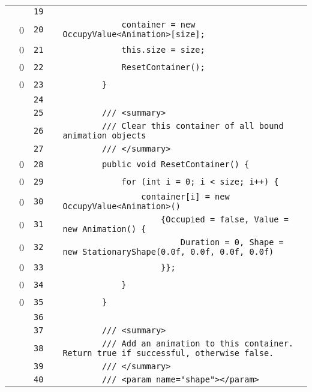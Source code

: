 \documentclass[a4paper,landscape,10pt]{article}
\begin{document}
\begin{longtable}[l]{lrrll}
\cellcolor{gray} &  & \verb~19~ & & \verb~~\\
\cellcolor{red} & 0 & \verb~20~ & & \verb~            container = new OccupyValue<Animation>[size];~\\
\cellcolor{red} & 0 & \verb~21~ & & \verb~            this.size = size;~\\
\cellcolor{red} & 0 & \verb~22~ & & \verb~            ResetContainer();~\\
\cellcolor{red} & 0 & \verb~23~ & & \verb~        }~\\
\cellcolor{gray} &  & \verb~24~ & & \verb~~\\
\cellcolor{gray} &  & \verb~25~ & & \verb~        /// <summary>~\\
\cellcolor{gray} &  & \verb~26~ & & \verb~        /// Clear this container of all bound animation objects~\\
\cellcolor{gray} &  & \verb~27~ & & \verb~        /// </summary>~\\
\cellcolor{red} & 0 & \verb~28~ & & \verb~        public void ResetContainer() {~\\
\cellcolor{red} & 0 & \verb~29~ & & \verb~            for (int i = 0; i < size; i++) {~\\
\cellcolor{red} & 0 & \verb~30~ & & \verb~                container[i] = new OccupyValue<Animation>()~\\
\cellcolor{red} & 0 & \verb~31~ & & \verb~                    {Occupied = false, Value = new Animation() {~\\
\cellcolor{red} & 0 & \verb~32~ & & \verb~                        Duration = 0, Shape = new StationaryShape(0.0f, 0.0f, 0.0f, 0.0f)~\\
\cellcolor{red} & 0 & \verb~33~ & & \verb~                    }};~\\
\cellcolor{red} & 0 & \verb~34~ & & \verb~            }~\\
\cellcolor{red} & 0 & \verb~35~ & & \verb~        }~\\
\cellcolor{gray} &  & \verb~36~ & & \verb~~\\
\cellcolor{gray} &  & \verb~37~ & & \verb~        /// <summary>~\\
\cellcolor{gray} &  & \verb~38~ & & \verb~        /// Add an animation to this container. Return true if successful, otherwise false.~\\
\cellcolor{gray} &  & \verb~39~ & & \verb~        /// </summary>~\\
\cellcolor{gray} &  & \verb~40~ & & \verb~        /// <param name="shape"></param>~\\

\end{longtable}
\end{document}
